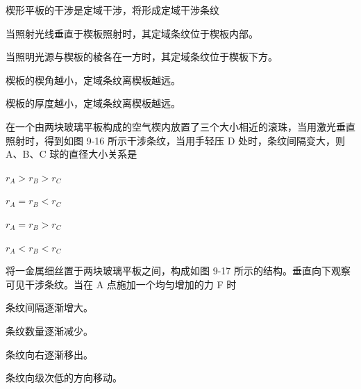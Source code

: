 \documentclass[standard, analysis, notocnum]{ExBook}
\newcommand{\answerarea}[1][8cm]{%
  \par\vspace{2mm}%
  \noindent{\color{themeColor!35}\rule{\linewidth}{0.4pt}}\par
  \noindent\begin{minipage}[t][#1][t]{\linewidth}\vspace{0pt}\end{minipage}\par
  \noindent{\color{themeColor!35}\rule{\linewidth}{0.4pt}}\par
}
\begin{document}
\begin{qitems}
\begin{bbox}
\answerarea[3.5cm]
\end{bbox}
\begin{bbox}
\qitem 楔形平板的干涉是定域干涉，将形成定域干涉条纹
\par\noindent\hspace{2em}当照射光线垂直于楔板照射时，其定域条纹位于楔板内部。
\par\noindent\hspace{2em}当照明光源与楔板的棱各在一方时，其定域条纹位于楔板下方。
\par\noindent\hspace{2em}楔板的楔角越小，定域条纹离楔板越远。
\par\noindent\hspace{2em}楔板的厚度越小，定域条纹离楔板越远。
\answerarea[3.5cm]
\end{bbox}
\begin{bbox}
\qitem 在一个由两块玻璃平板构成的空气楔内放置了三个大小相近的滚珠，当用激光垂直照射时，得到如图 9-16 所示干涉条纹，当用手轻压 D 处时，条纹间隔变大，则 A、B、C 球的直径大小关系是
\par\noindent\hspace{2em}$r_{A}>r_{B}>r_{C}$
\par\noindent\hspace{2em}$r_{A}=r_{B}<r_{C}$
\par\noindent\hspace{2em}$r_{A}=r_{B}>r_{C}$
\par\noindent\hspace{2em}$r_{A}<r_{B}<r_{C}$
\answerarea[3.5cm]
\end{bbox}
\begin{bbox}
\qitem 将一金属细丝置于两块玻璃平板之间，构成如图 9-17 所示的结构。垂直向下观察可见干涉条纹。当在 A 点施加一个均匀增加的力 F 时
\par\noindent\hspace{2em}条纹间隔逐渐增大。
\par\noindent\hspace{2em}条纹数量逐渐减少。
\par\noindent\hspace{2em}条纹向右逐渐移出。
\par\noindent\hspace{2em}条纹向级次低的方向移动。
\answerarea[3.5cm]
\end{bbox}
\begin{bbox}

\end{bbox}
\end{qitems}
\end{document}
